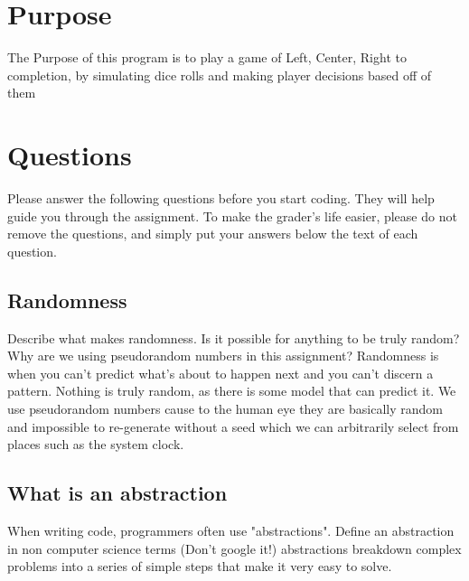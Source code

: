 \documentclass{article}
\title{\ASSIGNMENT}
\author{\NAME}
\date{\CLASS}
\begin{document}
\pagestyle{fancy}
\fancyfoot{}
\fancyhead{}
\fancyfoot[L]{\ASSIGNMENT\ -- \CLASS\ -- \NAME}
\fancyfoot[R]{\thepage}

\maketitle



\section*{Purpose}
The Purpose of this program is to play a game of Left, Center, Right to completion, by simulating dice rolls and making player decisions based off of them

\section{Questions}

Please answer the following questions before you start coding. They will help guide you through the assignment. To make the grader's life easier, please do not remove the questions, and simply put your answers below the text of each question. 

\subsection{Randomness}

Describe what makes randomness. Is it possible for anything to be truly random? Why are we using pseudorandom numbers in this assignment?
Randomness is when you can't predict what's about to happen next and you can't discern a pattern. Nothing is truly random, as there is some model that can predict it. We use pseudorandom numbers cause to the human eye they are basically random and impossible to re-generate without a seed which we can arbitrarily select from places such as the system clock.

\subsection{What is an abstraction}

When writing code, programmers often use "abstractions". Define an abstraction in non computer science terms (Don't google it!)
abstractions breakdown complex problems into a series of simple steps that make it very easy to solve.
\end{document}
